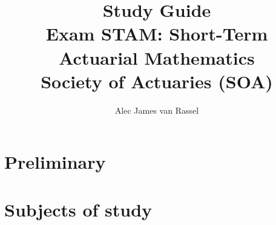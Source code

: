 \documentclass[12pt, titlepage, french]{report}
\title{
	Study Guide	\\
	\large Exam STAM: Short-Term Actuarial Mathematics\\
	Society of Actuaries (SOA)}
\date{}
\author{Alec James van Rassel}
\begin{document}
\maketitle

\tableofcontents

\clearpage

\part*{Preliminary}



\part*{Subjects of study}

\newpage



\newpage



\newpage



\newpage



\newpage



\newpage



\newpage



\newpage



\newpage


\end{document}
